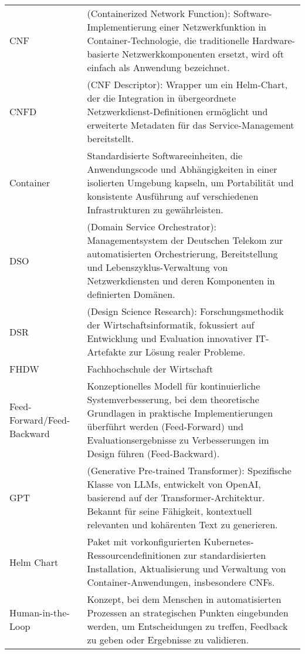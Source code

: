 \begin{tabularx}{\textwidth}{lX}
CNF & (Containerized Network Function): Software-Implementierung einer Netzwerkfunktion in Container-Technologie, die traditionelle Hardware-basierte Netzwerkkomponenten ersetzt, wird oft einfach als Anwendung bezeichnet.\\

CNFD & (CNF Descriptor): Wrapper um ein Helm-Chart, der die Integration in übergeordnete Netzwerkdienst-Definitionen ermöglicht und erweiterte Metadaten für das Service-Management bereitstellt.\\

Container & Standardisierte Softwareeinheiten, die Anwendungscode und Abhängigkeiten in einer isolierten Umgebung kapseln, um Portabilität und konsistente Ausführung auf verschiedenen Infrastrukturen zu gewährleisten.\\

DSO & (Domain Service Orchestrator): Managementsystem der Deutschen Telekom zur automatisierten Orchestrierung, Bereitstellung und Lebenszyklus-Verwaltung von Netzwerkdiensten und deren Komponenten in definierten Domänen.\\

DSR & (Design Science Research): Forschungsmethodik der Wirtschaftsinformatik, fokussiert auf Entwicklung und Evaluation innovativer IT-Artefakte zur Lösung realer Probleme.\\

FHDW & Fachhochschule der Wirtschaft \\

Feed-Forward/Feed-Backward & Konzeptionelles Modell für kontinuierliche Systemverbesserung, bei dem theoretische Grundlagen in praktische Implementierungen überführt werden (Feed-Forward) und Evaluationsergebnisse zu Verbesserungen im Design führen (Feed-Backward).\\

GPT & (Generative Pre-trained Transformer): Spezifische Klasse von LLMs, entwickelt von OpenAI, basierend auf der Transformer-Architektur. Bekannt für seine Fähigkeit, kontextuell relevanten und kohärenten Text zu generieren.\\

Helm Chart & Paket mit vorkonfigurierten Kubernetes-Ressourcendefinitionen zur standardisierten Installation, Aktualisierung und Verwaltung von Container-Anwendungen, insbesondere CNFs.\\

Human-in-the-Loop & Konzept, bei dem Menschen in automatisierten Prozessen an strategischen Punkten eingebunden werden, um Entscheidungen zu treffen, Feedback zu geben oder Ergebnisse zu validieren.\\


\end{tabularx}
